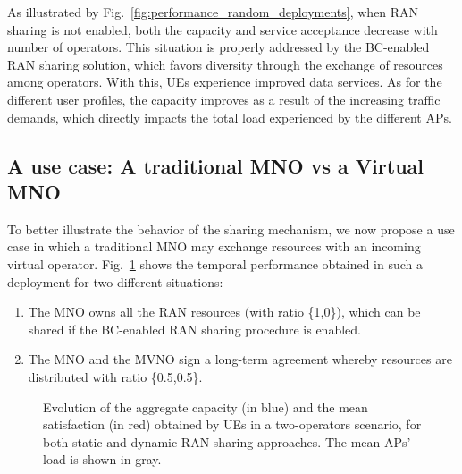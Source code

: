 \documentclass[conference]{IEEEtran}
\theoremstyle{definition}
\begin{document}
As illustrated by Fig.~\ref{fig:performance_random_deployments}, when RAN sharing is not enabled, both the capacity and service acceptance decrease with number of operators. This situation is properly addressed by the BC-enabled RAN sharing solution, which favors diversity through the exchange of resources among operators. With this, UEs experience improved data services. As for the different user profiles, the capacity improves as a result of the increasing traffic demands, which directly impacts the total load experienced by the different APs.

\subsection{A use case: A traditional MNO vs a Virtual MNO}

To better illustrate the behavior of the sharing mechanism, we now propose a use case in which a traditional MNO may exchange resources with an incoming virtual operator. Fig.~\ref{fig:temporal_capacity} shows the temporal performance obtained in such a deployment for two different situations: 
\begin{enumerate}
    \item The MNO owns all the RAN resources (with ratio \{1,0\}), which can be shared if the BC-enabled RAN sharing procedure is enabled.
    \item The MNO and the MVNO sign a long-term agreement whereby resources are distributed with ratio \{0.5,0.5\}.
\end{enumerate}

\begin{figure}[ht!]
\centering
{} 
\caption{Evolution of the aggregate capacity (in blue) and the mean satisfaction (in red) obtained by UEs in a two-operators scenario, for both static and dynamic RAN sharing approaches. The mean APs' load is shown in gray.}
\label{fig:temporal_capacity}
\end{figure}
\end{document}
